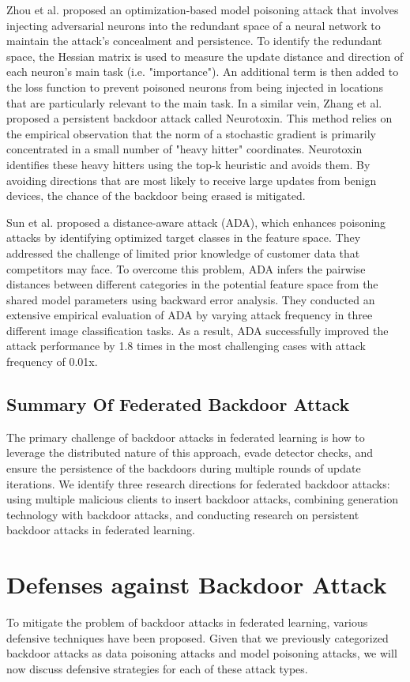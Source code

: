 \documentclass[conference]{IEEEtran}
\begin{document}
Zhou et al.\cite{b63} proposed an optimization-based model poisoning attack that
involves injecting adversarial neurons into the redundant space of a neural network
to maintain the attack's concealment and persistence. To identify the redundant
space, the Hessian matrix is used to measure the update distance and direction of each neuron's main task (i.e. "importance").
An additional term is then added to the loss function to prevent poisoned neurons from being injected
in locations that are particularly relevant to the main task.
In a similar vein, Zhang et al.\cite{b62}
proposed a persistent backdoor attack called Neurotoxin. This method
relies on the empirical observation that the norm of a stochastic gradient
is primarily concentrated in a small number of "heavy hitter" coordinates.
Neurotoxin identifies these heavy hitters using the top-k heuristic and
avoids them. By avoiding directions that are most likely to receive large
updates from benign devices, the chance of the backdoor being erased is mitigated.

Sun et al. \cite{b65}proposed a distance-aware attack (ADA), which enhances poisoning attacks
by identifying optimized target classes in the feature space. They addressed the challenge of
limited prior knowledge of customer data that competitors may face. To overcome this problem,
ADA infers the pairwise distances between different categories in the potential feature space
from the shared model parameters using backward error analysis. They conducted an extensive
empirical evaluation of ADA by varying attack frequency in three different image classification
tasks. As a result, ADA successfully improved the attack performance by 1.8 times in the most
challenging cases with attack frequency of 0.01x.

\subsection{Summary Of Federated Backdoor Attack}
The primary challenge of backdoor attacks in federated learning is how
to leverage the distributed nature of this approach, evade detector checks,
and ensure the persistence of the backdoors during multiple rounds of update
iterations. We identify three research directions for federated backdoor
attacks: using multiple malicious clients to insert backdoor attacks,
combining generation technology with backdoor attacks, and conducting
research on persistent backdoor attacks in federated learning.

\section{Defenses against Backdoor Attack}
To mitigate the problem of backdoor attacks in
federated learning, various defensive techniques have been proposed.
Given that we previously categorized backdoor attacks as data poisoning
attacks and model poisoning attacks, we will now discuss defensive strategies
for each of these attack types.
\end{document}
